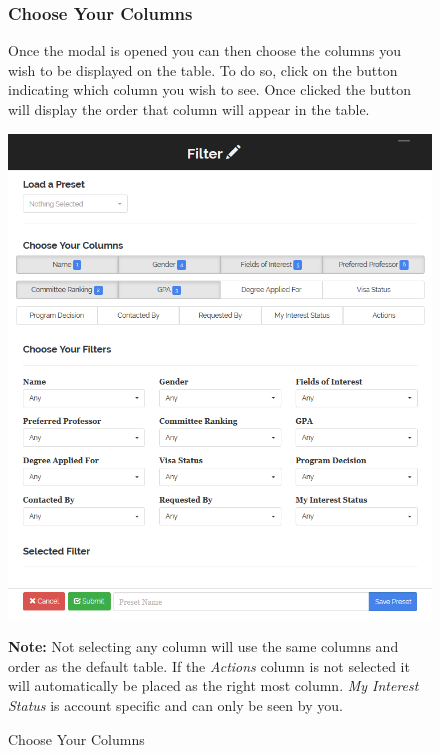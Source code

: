 \documentclass[fontsize=12pt,paper=letter,twoside]{scrartcl}
\begin{document}
\clearpage
\begin{figure}[!htb]
\subsubsection{Choose Your Columns}
Once the modal is opened you can then choose the columns you wish to be displayed on the table. To do so, click on the button indicating which column you wish to see. Once clicked the button will display the order that column will appear in the table.\begin{center}
\includegraphics[width=.99\textwidth]{images/choose_columns.png}
\end{center}
\caption{Choose Your Columns}
\label{fig:choose_columns}
\textbf{Note:} Not selecting any column will use the same columns and order as the default table. If the \emph{Actions} column is not selected it will automatically be placed as the right most column. \emph{My Interest Status} is account specific and can only be seen by you.
\end{figure}

\clearpage
\end{document}
